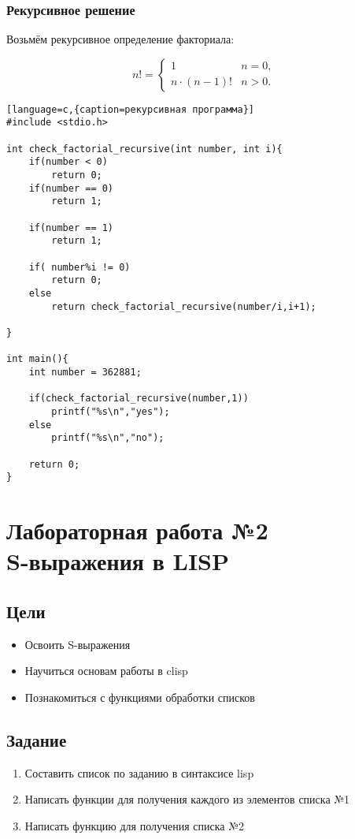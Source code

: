 \documentclass[a4paper,12pt]{article}
\begin{document}
\subsubsection{Рекурсивное решение}

Возьмём рекурсивное определение факториала:

\begin{equation}
n!= \begin{cases}
1 & n = 0,\\
n \cdot (n-1)! & n > 0.
\end{cases}
\end{equation}

\begin{lstlisting}[language=c,{caption=рекурсивная программа}]
#include <stdio.h>

int check_factorial_recursive(int number, int i){
	if(number < 0) 
		return 0;	
	if(number == 0)
		return 1;

	if(number == 1)
		return 1;
	
	if( number%i != 0)
		return 0;
	else		
		return check_factorial_recursive(number/i,i+1);
	
}

int main(){
	int number = 362881;

	if(check_factorial_recursive(number,1))
		printf("%s\n","yes");
	else
		printf("%s\n","no");

	return 0;
}
\end{lstlisting}

\newpage
\section{Лабораторная работа №2\\S-выражения в LISP}
\subsection{Цели}

\begin{itemize}
	\item Освоить S-выражения
	\item Научиться основам работы в clisp
	\item Познакомиться с функциями обработки списков
\end{itemize}

\subsection{Задание}
\begin{enumerate}
	\item Составить список по заданию в синтаксисе lisp
	\item Написать функции для получения каждого из элементов списка №1
	\item Написать функцию для получения списка №2
\end{enumerate}
\end{document}
